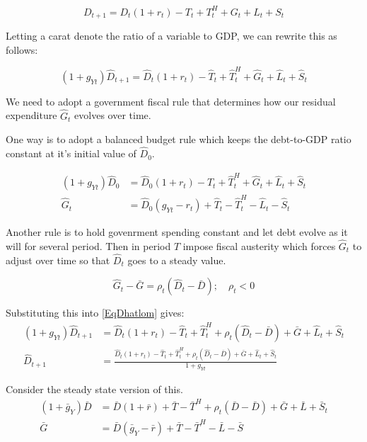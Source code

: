       \begin{equation}
        D_{t+1} = D_t(1+r_t) - T_t + T^H_t + G_t + L_t + S_t
      \end{equation}

      Letting a carat denote the ratio of a variable to GDP, we can rewrite this as follows:

      \begin{equation} \label{EqDhatlom}
        (1+g_{Yt}) \hat D_{t+1} = \hat D_t(1+r_t) - \hat T_t + \hat T^H_t + \hat G_t + \hat L_t + \hat S_t
      \end{equation}

      We need to adopt a government fiscal rule that determines how our residual expenditure $\hat G_t$ evolves over time.

      One way is to adopt a balanced budget rule which keeps the debt-to-GDP ratio constant at it's initial value of $\hat D_0$.

      \begin{align}
        (1+g_{Yt}) \hat D_0 & = \hat D_0(1+r_t) - \hat T_t + \hat T^H_t + \hat G_t + \hat L_t + \hat S_t \nonumber \\
        \hat G_t & = \hat D_0(g_{Yt}-r_t) + \hat T_t - \hat T^H_t -\hat L_t - \hat S_t \label{EqBalBudRule}
      \end{align}

      Another rule is to hold govenrment spending constant and let debt evolve as it will for several period.  Then in period $T$ impose fiscal austerity which forces $\hat G_t$ to adjust over time so that $\hat D_t$ goes to a steady value.

      \begin{equation}
        \hat G_t - \bar G = \rho_t (\hat D_t - \bar D);\quad \rho_t<0 \label{EqAdjRule}
      \end{equation}

      Substituting this into \eqref{EqDhatlom} gives:
      \begin{align}
        (1+g_{Yt}) \hat D_{t+1} & = \hat D_t(1+r_t) - \hat T_t + \hat T^H_t + \rho_t (\hat D_t - \bar D) + \bar G + \hat L_t + \hat S_t \nonumber \\
        \hat D_{t+1} & = \frac{\hat D_t(1+r_t) - \hat T_t + \hat T^H_t + \rho_t (\hat D_t - \bar D) + \bar G + \hat L_t + \hat S_t }{1+g_{Yt}} \label{EqDhatlom2}
      \end{align}

      Consider the steady state version of this.
      \begin{align}
        (1+\bar g_{Y}) \bar D & = \bar D(1+\bar r) + \bar T - \bar T^H + \rho_t (\bar D - \bar D) + \bar G + \bar L + \bar S_t  \nonumber \\
        \bar G & = \bar D(\bar g_{Y} -\bar r) + \bar T - \bar T^H - \bar L - \bar S  \label{EqGbardef}
      \end{align}

